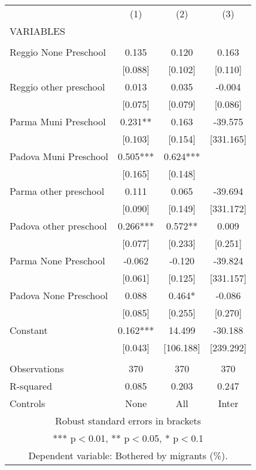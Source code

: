 \begin{tabular}{lccc} \hline
 & (1) & (2) & (3) \\
VARIABLES &  &  &  \\ \hline
 &  &  &  \\
Reggio None Preschool & 0.135 & 0.120 & 0.163 \\
 & [0.088] & [0.102] & [0.110] \\
Reggio other preschool & 0.013 & 0.035 & -0.004 \\
 & [0.075] & [0.079] & [0.086] \\
Parma Muni Preschool & 0.231** & 0.163 & -39.575 \\
 & [0.103] & [0.154] & [331.165] \\
Padova Muni Preschool & 0.505*** & 0.624*** &  \\
 & [0.165] & [0.148] &  \\
Parma other preschool & 0.111 & 0.065 & -39.694 \\
 & [0.090] & [0.149] & [331.172] \\
Padova other preschool & 0.266*** & 0.572** & 0.009 \\
 & [0.077] & [0.233] & [0.251] \\
Parma None Preschool & -0.062 & -0.120 & -39.824 \\
 & [0.061] & [0.125] & [331.157] \\
Padova None Preschool & 0.088 & 0.464* & -0.086 \\
 & [0.085] & [0.255] & [0.270] \\
Constant & 0.162*** & 14.499 & -30.188 \\
 & [0.043] & [106.188] & [239.292] \\
 &  &  &  \\
Observations & 370 & 370 & 370 \\
R-squared & 0.085 & 0.203 & 0.247 \\
 Controls & None & All & Inter \\ \hline
\multicolumn{4}{c}{ Robust standard errors in brackets} \\
\multicolumn{4}{c}{ *** p$<$0.01, ** p$<$0.05, * p$<$0.1} \\
\multicolumn{4}{c}{ Dependent variable: Bothered by migrants (\%).} \\
\end{tabular}
